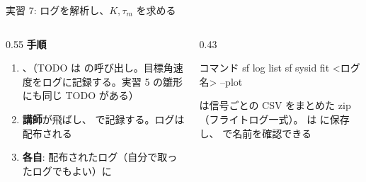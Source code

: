 \begin{frame}[fragile]{実習 7: ログを解析し、$K,\tau_m$ を求める}
  \begin{columns}[T]
    \begin{column}{0.55\textwidth}
      {\footnotesize\textbf{\textcolor{sfblue}{手順}}}\par\vspace{-2pt}
      \footnotesize
      \begin{enumerate}\setlength{\itemsep}{0pt}
        \item {}、（TODO は  の呼び出し。目標角速度をログに記録する。実習 5 の雛形にも同じ TODO がある）
        \item \textbf{講師}が飛ばし、 で記録する。ログは配布される
        \item \textbf{各自}: 配布されたログ（自分で取ったログでもよい）に 
      \end{enumerate}
    \end{column}
    \begin{column}{0.43\textwidth}
      \begin{sflisting}[basicstyle=\ttfamily\scriptsize]{コマンド}
sf log list
sf sysid fit <ログ名> --plot
      \end{sflisting}
      \vspace{-1mm}
      {\scriptsize {} は信号ごとの CSV をまとめた zip（フライトログ一式）。 は  に保存し、 で名前を確認できる\par}
    \end{column}
  \end{columns}
\end{frame}

